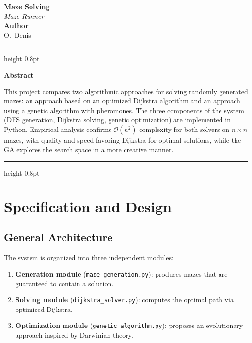 \documentclass[12pt, a4paper]{article}
\theoremstyle{definition}
\newcommand{\bigO}[1]{\mathcal{O}\!\left(#1\right)}
\newcommand{\code}[1]{\texttt{#1}}
\begin{document}
\begin{titlepage}
    \centering
    \vspace*{2cm}

    {\Huge\bfseries Maze Solving}\\[0.4em]
    {\Large\itshape Maze Runner}\\[2cm]

    {\large\bfseries Author}\\[0.4em]
    {\large O.~Denis}\\[2cm]

    \hrule height 0.8pt
    \vspace{1em}
    {\normalsize
    \textbf{Abstract}\\[0.6em]
    \begin{minipage}{0.88\textwidth}
        This project compares two algorithmic approaches for solving randomly generated
        mazes: an approach based on an optimized Dijkstra algorithm and an approach using
        a genetic algorithm with pheromones.
        The three components of the system (DFS generation, Dijkstra solving, genetic
        optimization) are implemented in Python.
        Empirical analysis confirms $\bigO{n^2}$ complexity for both solvers on
        $n \times n$ mazes, with quality and speed favoring Dijkstra for optimal
        solutions, while the GA explores the search space in a more creative manner.
    \end{minipage}
    }
    \vspace{1em}
    \hrule height 0.8pt

    \vfill
\end{titlepage}

\tableofcontents
\newpage

\section{Specification and Design}

\subsection{General Architecture}

The system is organized into three independent modules:

\begin{enumerate}[leftmargin=*, label=\arabic*.]
    \item \textbf{Generation module} (\code{maze\_generation.py}): produces mazes
          that are guaranteed to contain a solution.
    \item \textbf{Solving module} (\code{dijkstra\_solver.py}): computes the optimal
          path via optimized Dijkstra.
    \item \textbf{Optimization module} (\code{genetic\_algorithm.py}): proposes an
          evolutionary approach inspired by Darwinian theory.
\end{enumerate}
\end{document}
